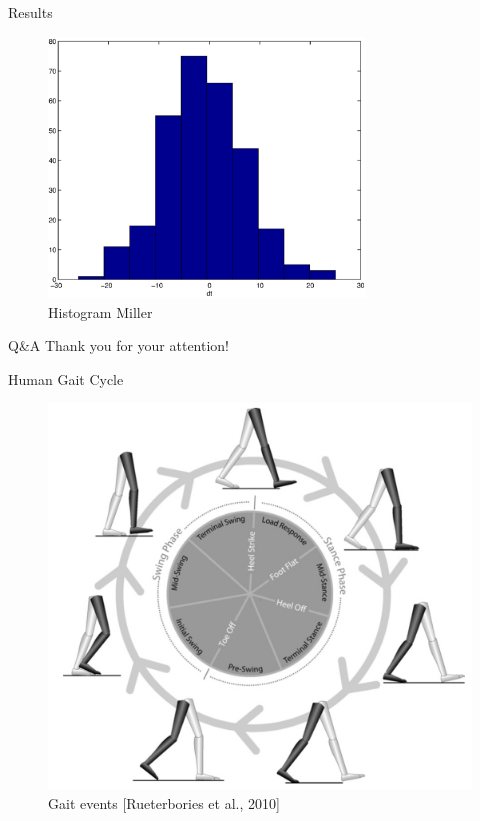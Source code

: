 \documentclass{beamer}
\begin{document}
\begin{frame}{Results}
    \begin{figure}
    \begin{center}
        \includegraphics[width=0.75\textwidth]{figures/hist_miller.eps}
        \caption{Histogram Miller}
        \label{fig:hist_miller}
    \end{center}
    \end{figure}
\end{frame}

\begin{frame}{Q\&A}
    \Large
    \centering
    Thank you for your attention!
\end{frame}

\begin{frame}{Human Gait Cycle}
    \begin{figure}[H]
    \begin{center}
        \includegraphics[height=.8\textheight]{figures/gait_events.jpg}
        \caption{Gait events [Rueterbories et al., 2010]}
        \label{fig:gait_events}
    \end{center}
    \end{figure}
\end{frame}
\end{document}
